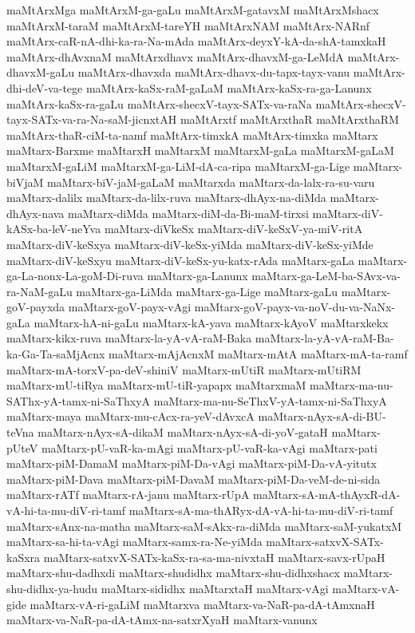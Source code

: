 {maMtArxMga
maMtArxM-ga-gaLu
maMtArxM-gatavxM
maMtArxMshacx
maMtArxM-taraM
maMtArxM-tareYH
maMtArxNAM
maMtArx-NARnf
maMtArx-caR-nA-dhi-ka-ra-Na-mAda
maMtArx-deyxY-kA-da-shA-tamxkaH
maMtArx-dhAvxnaM
maMtArxdhavx
maMtArx-dhavxM-ga-LeMdA
maMtArx-dhavxM-gaLu
maMtArx-dhavxda
maMtArx-dhavx-du-tapx-tayx-vanu
maMtArx-dhi-deV-va-tege
maMtArx-kaSx-raM-gaLaM
maMtArx-kaSx-ra-ga-Lanunx
maMtArx-kaSx-ra-gaLu
maMtArx-shecxV-tayx-SATx-va-raNa
maMtArx-shecxV-tayx-SATx-va-ra-Na-saM-jicnxtAH
maMtArxtf
maMtArxthaR
maMtArxthaRM
maMtArx-thaR-ciM-ta-namf
maMtArx-timxkA
maMtArx-timxka
maMtarx
maMtarx-Barxme
maMtarxH
maMtarxM
maMtarxM-gaLa
maMtarxM-gaLaM
maMtarxM-gaLiM
maMtarxM-ga-LiM-dA-ca-ripa
maMtarxM-ga-Lige
maMtarx-biVjaM
maMtarx-biV-jaM-gaLaM
maMtarxda
maMtarx-da-lalx-ra-su-varu
maMtarx-dalilx
maMtarx-da-lilx-ruva
maMtarx-dhAyx-na-diMda
maMtarx-dhAyx-nava
maMtarx-diMda
maMtarx-diM-da-Bi-maM-tirxsi
maMtarx-diV-kASx-ba-leV-neYva
maMtarx-diVkeSx
maMtarx-diV-keSxV-ya-miV-ritA
maMtarx-diV-keSxya
maMtarx-diV-keSx-yiMda
maMtarx-diV-keSx-yiMde
maMtarx-diV-keSxyu
maMtarx-diV-keSx-yu-katx-rAda
maMtarx-gaLa
maMtarx-ga-La-nonx-La-goM-Di-ruva
maMtarx-ga-Lanunx
maMtarx-ga-LeM-ba-SAvx-va-ra-NaM-gaLu
maMtarx-ga-LiMda
maMtarx-ga-Lige
maMtarx-gaLu
maMtarx-goV-payxda
maMtarx-goV-payx-vAgi
maMtarx-goV-payx-va-noV-du-va-NaNx-gaLa
maMtarx-hA-ni-gaLu
maMtarx-kA-yava
maMtarx-kAyoV
maMtarxkekx
maMtarx-kikx-ruva
maMtarx-la-yA-vA-raM-Baka
maMtarx-la-yA-vA-raM-Ba-ka-Ga-Ta-saMjAcnx
maMtarx-mAjAcnxM
maMtarx-mAtA
maMtarx-mA-ta-ramf
maMtarx-mA-torxV-pa-deV-shiniV
maMtarx-mUtiR
maMtarx-mUtiRM
maMtarx-mU-tiRya
maMtarx-mU-tiR-yapapx
maMtarxmaM
maMtarx-ma-nu-SAThx-yA-tamx-ni-SaThxyA
maMtarx-ma-nu-SeThxV-yA-tamx-ni-SaThxyA
maMtarx-maya
maMtarx-mu-cAcx-ra-yeV-dAvxcA
maMtarx-nAyx-sA-di-BU-teVna
maMtarx-nAyx-sA-dikaM
maMtarx-nAyx-sA-di-yoV-gataH
maMtarx-pUteV
maMtarx-pU-vaR-ka-mAgi
maMtarx-pU-vaR-ka-vAgi
maMtarx-pati
maMtarx-piM-DamaM
maMtarx-piM-Da-vAgi
maMtarx-piM-Da-vA-yitutx
maMtarx-piM-Dava
maMtarx-piM-DavaM
maMtarx-piM-Da-veM-de-ni-sida
maMtarx-rATf
maMtarx-rA-janu
maMtarx-rUpA
maMtarx-sA-mA-thAyxR-dA-vA-hi-ta-mu-diV-ri-tamf
maMtarx-sA-ma-thARyx-dA-vA-hi-ta-mu-diV-ri-tamf
maMtarx-sAnx-na-matha
maMtarx-saM-sAkx-ra-diMda
maMtarx-saM-yukatxM
maMtarx-sa-hi-ta-vAgi
maMtarx-samx-ra-Ne-yiMda
maMtarx-satxvX-SATx-kaSxra
maMtarx-satxvX-SATx-kaSx-ra-sa-ma-nivxtaH
maMtarx-savx-rUpaH
maMtarx-shu-dadhxdi
maMtarx-shudidhx
maMtarx-shu-didhxshacx
maMtarx-shu-didhx-ya-hudu
maMtarx-sididhx
maMtarxtaH
maMtarx-vAgi
maMtarx-vA-gide
maMtarx-vA-ri-gaLiM
maMtarxva
maMtarx-va-NaR-pa-dA-tAmxnaH
maMtarx-va-NaR-pa-dA-tAmx-na-satxrXyaH
maMtarx-vanunx
}
